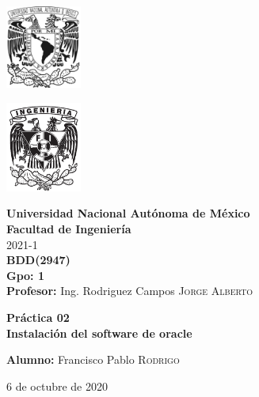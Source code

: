 \documentclass{article}
\newcommand{\materia}{BDD}
\newcommand{\clave}{2947}
\newcommand{\profesor}{Ing. Rodriguez Campos \textsc{Jorge Alberto}}
\newcommand{\semestre}{2021-1}
\newcommand{\alumno}{Francisco Pablo \textsc{Rodrigo}}
\newcommand{\actividad}{Práctica 02}
\newcommand{\titulo}{Instalación del software de oracle}
\newcommand{\fechaEntrega}{6 de octubre de 2020}
\begin{document}
\thispagestyle{empty}
\begin{minipage}[t][5cm][t]{0.2\linewidth}
    \includegraphics[width=2.5cm]{unam.jpg}
    \vspace{10cm}

    \includegraphics[width=2.5cm]{fiblack}
\end{minipage}
\begin{minipage}[t]{0.7\linewidth}
    \vspace{-2.5cm}
    \LARGE{\textbf{Universidad Nacional Autónoma de México}}\\
    \Large{\textbf{Facultad de Ingeniería}} \\

    \large{\semestre}\\[2cm]

    \large{\textbf{\materia (\clave)}}\\
    \large{\textbf{Gpo: 1}}\\[5mm]
    \large{\textbf{Profesor:} \profesor}\\ [1.5cm]
    \begin{center}
        \LARGE{\textbf{\actividad}}\\
        \LARGE{\textbf{\titulo}}\\
    \end{center}

    \vspace{3.3cm}

    \large{\textbf{Alumno:} \alumno} \\[1.5cm]

    \begin{flushright}
        \fechaEntrega%
    \end{flushright}
\end{minipage}

\newpage
\end{document}
